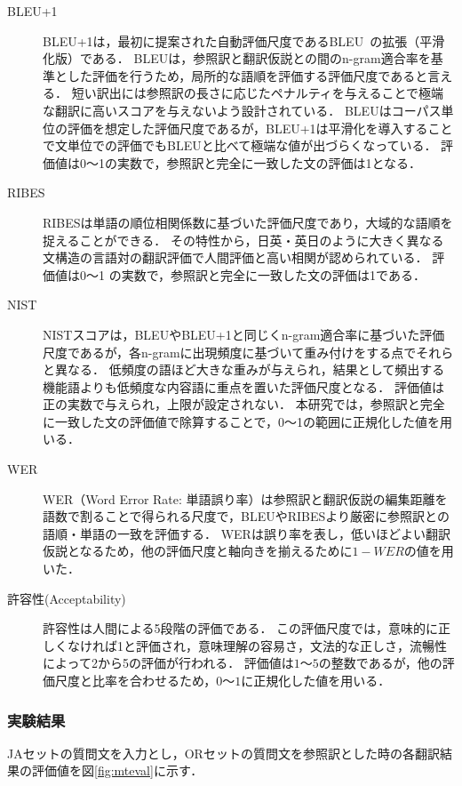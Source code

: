 \documentclass[japanese]{jnlp_1.4}
\begin{document}
\begin{description}
\item[BLEU+1]
BLEU+1は，最初に提案された自動評価尺度であるBLEU~\cite{bleu}の拡張（平滑化版）である．
BLEUは，参照訳と翻訳仮説との間のn-gram適合率を基準とした評価を行うため，局所的な語順を評価する評価尺度であると言える．
短い訳出には参照訳の長さに応じたペナルティを与えることで極端な翻訳に高いスコアを与えないよう設計されている．
BLEUはコーパス単位の評価を想定した評価尺度であるが，BLEU+1は平滑化を導入することで文単位での評価でもBLEUと比べて極端な値が出づらくなっている．
評価値は0〜1の実数で，参照訳と完全に一致した文の評価は1となる．

\item[RIBES]
RIBESは単語の順位相関係数に基づいた評価尺度であり，大域的な語順を捉えることができる．
その特性から，日英・英日のように大きく異なる文構造の言語対の翻訳評価で人間評価と高い相関が認められている．
評価値は0〜1 の実数で，参照訳と完全に一致した文の評価は1である．

\item[NIST]
NISTスコアは，BLEUやBLEU+1と同じくn-gram適合率に基づいた評価尺度であるが，各n-gramに出現頻度に基づいて重み付けをする点でそれらと異なる．
低頻度の語ほど大きな重みが与えられ，結果として頻出する機能語よりも低頻度な内容語に重点を置いた評価尺度となる．
評価値は正の実数で与えられ，上限が設定されない．
本研究では，参照訳と完全に一致した文の評価値で除算することで，0〜1の範囲に正規化した値を用いる．

\item[WER]
WER（Word Error Rate: 単語誤り率）は参照訳と翻訳仮説の編集距離を語数で割ることで得られる尺度で，BLEUやRIBESより厳密に参照訳との語順・単語の一致を評価する．
WERは誤り率を表し，低いほどよい翻訳仮説となるため，他の評価尺度と軸向きを揃えるために$1-{WER}$の値を用いた．

\item[許容性(Acceptability)]
許容性は人間による5段階の評価である．
この評価尺度では，意味的に正しくなければ1と評価され，意味理解の容易さ，文法的な正しさ，流暢性によって2から5の評価が行われる．
評価値は$1〜5$の整数であるが，他の評価尺度と比率を合わせるため，$0〜1$に正規化した値を用いる．
\end{description}


\subsubsection{実験結果}

JAセットの質問文を入力とし，ORセットの質問文を参照訳とした時の各翻訳結果の評価値を図\ref{fig:mteval}に示す．
\end{document}
